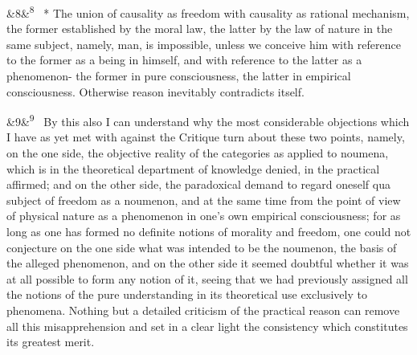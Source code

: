 \documentclass[12pt]{article}
\newcommand{\para}[1][]{\par\noindent\ifx&#1&\else\textsuperscript{\footnotesize #1}~\fi}
\begin{document}
\para[8] * The union of causality as freedom with causality as rational mechanism, the former established by the moral law, the latter by the law of nature in the same subject, namely, man, is impossible, unless we conceive him with reference to the former as a being in himself, and with reference to the latter as a phenomenon- the former in pure consciousness, the latter in empirical consciousness. Otherwise reason inevitably contradicts itself.

\para[9] By this also I can understand why the most considerable objections which I have as yet met with against the Critique turn about these two points, namely, on the one side, the objective reality of the categories as applied to noumena, which is in the theoretical department of knowledge denied, in the practical affirmed; and on the other side, the paradoxical demand to regard oneself qua subject of freedom as a noumenon, and at the same time from the point of view of physical nature as a phenomenon in one's own empirical consciousness; for as long as one has formed no definite notions of morality and freedom, one could not conjecture on the one side what was intended to be the noumenon, the basis of the alleged phenomenon, and on the other side it seemed doubtful whether it was at all possible to form any notion of it, seeing that we had previously assigned all the notions of the pure understanding in its theoretical use exclusively to phenomena. Nothing but a detailed criticism of the practical reason can remove all this misapprehension and set in a clear light the consistency which constitutes its greatest merit.
\end{document}
